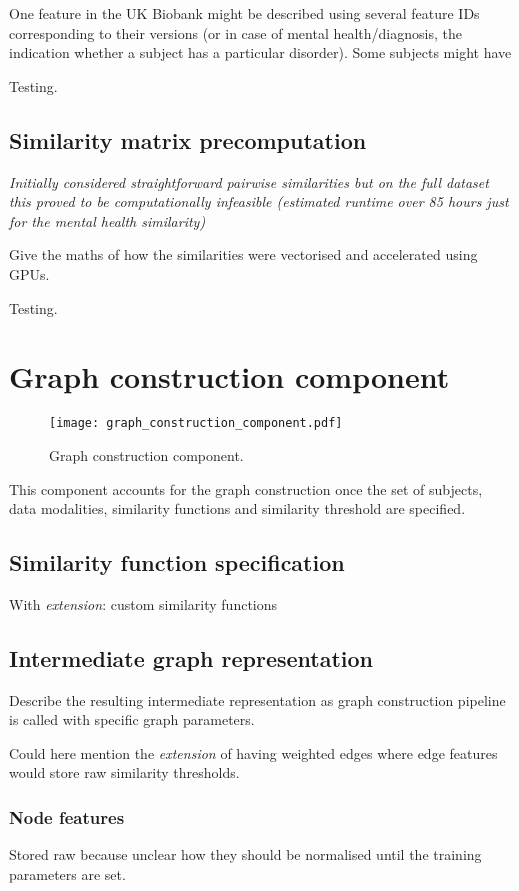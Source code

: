 One feature in the UK Biobank might be described using several feature IDs corresponding to their versions (or in case of mental health/diagnosis, the indication whether a subject has a particular disorder). Some subjects might have 

Testing.

\subsection{Similarity matrix precomputation}
\textit{Initially considered straightforward pairwise similarities but on the full dataset this proved to be computationally infeasible (estimated runtime over 85 hours just for the mental health similarity)}

Give the maths of how the similarities were vectorised and accelerated using GPUs.

Testing.

\section{Graph construction component}

\begin{figure}[h]
    \texttt{[image: graph\_construction\_component.pdf]}
    \caption{Graph construction component.}\label{graph-construction-component}
\end{figure}

This component accounts for the graph construction once the set of subjects, data modalities, similarity functions and similarity threshold are specified.


\subsection{Similarity function specification}
With \textit{extension}: custom similarity functions


\subsection{Intermediate graph representation}
Describe the resulting intermediate representation as graph construction pipeline is called with specific graph parameters.

Could here mention the \textit{extension} of having weighted edges where edge features would store raw similarity thresholds.

\subsubsection{Node features}
Stored raw because unclear how they should be normalised until the training parameters are set.

